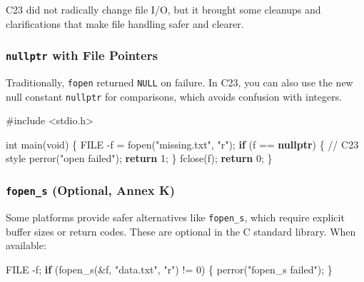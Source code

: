 \documentclass[
  letterpaper,
  DIV=11,
  numbers=noendperiod]{scrreprt}
\newenvironment{Shaded}{\begin{snugshade}}{\end{snugshade}}
\newcommand{\CommentTok}[1]{\textcolor[rgb]{0.37,0.37,0.37}{#1}}
\newcommand{\ControlFlowTok}[1]{\textcolor[rgb]{0.00,0.23,0.31}{\textbf{#1}}}
\newcommand{\DataTypeTok}[1]{\textcolor[rgb]{0.68,0.00,0.00}{#1}}
\newcommand{\DecValTok}[1]{\textcolor[rgb]{0.68,0.00,0.00}{#1}}
\newcommand{\ImportTok}[1]{\textcolor[rgb]{0.00,0.46,0.62}{#1}}
\newcommand{\KeywordTok}[1]{\textcolor[rgb]{0.00,0.23,0.31}{\textbf{#1}}}
\newcommand{\NormalTok}[1]{\textcolor[rgb]{0.00,0.23,0.31}{#1}}
\newcommand{\OperatorTok}[1]{\textcolor[rgb]{0.37,0.37,0.37}{#1}}
\newcommand{\PreprocessorTok}[1]{\textcolor[rgb]{0.68,0.00,0.00}{#1}}
\newcommand{\StringTok}[1]{\textcolor[rgb]{0.13,0.47,0.30}{#1}}
\begin{document}
C23 did not radically change file I/O, but it brought some cleanups and
clarifications that make file handling safer and clearer.

\subsubsection{\texorpdfstring{\texttt{nullptr} with File
Pointers}{nullptr with File Pointers}}\label{nullptr-with-file-pointers}

Traditionally, \texttt{fopen} returned \texttt{NULL} on failure. In C23,
you can also use the new null constant \texttt{nullptr} for comparisons,
which avoids confusion with integers.

\begin{Shaded}
\begin{Highlighting}[]
\PreprocessorTok{\#include }\ImportTok{\textless{}stdio.h\textgreater{}}

\DataTypeTok{int}\NormalTok{ main}\OperatorTok{(}\DataTypeTok{void}\OperatorTok{)} \OperatorTok{\{}
    \DataTypeTok{FILE} \OperatorTok{{-}}\NormalTok{f }\OperatorTok{=}\NormalTok{ fopen}\OperatorTok{(}\StringTok{"missing.txt"}\OperatorTok{,} \StringTok{"r"}\OperatorTok{);}
    \ControlFlowTok{if} \OperatorTok{(}\NormalTok{f }\OperatorTok{==} \KeywordTok{nullptr}\OperatorTok{)} \OperatorTok{\{}   \CommentTok{// C23 style}
\NormalTok{        perror}\OperatorTok{(}\StringTok{"open failed"}\OperatorTok{);}
        \ControlFlowTok{return} \DecValTok{1}\OperatorTok{;}
    \OperatorTok{\}}
\NormalTok{    fclose}\OperatorTok{(}\NormalTok{f}\OperatorTok{);}
    \ControlFlowTok{return} \DecValTok{0}\OperatorTok{;}
\OperatorTok{\}}
\end{Highlighting}
\end{Shaded}

\subsubsection{\texorpdfstring{\texttt{fopen\_s} (Optional, Annex
K)}{fopen\_s (Optional, Annex K)}}\label{fopen_s-optional-annex-k}

Some platforms provide safer alternatives like \texttt{fopen\_s}, which
require explicit buffer sizes or return codes. These are optional in the
C standard library. When available:

\begin{Shaded}
\begin{Highlighting}[]
\DataTypeTok{FILE} \OperatorTok{{-}}\NormalTok{f}\OperatorTok{;}
\ControlFlowTok{if} \OperatorTok{(}\NormalTok{fopen\_s}\OperatorTok{(\&}\NormalTok{f}\OperatorTok{,} \StringTok{"data.txt"}\OperatorTok{,} \StringTok{"r"}\OperatorTok{)} \OperatorTok{!=} \DecValTok{0}\OperatorTok{)} \OperatorTok{\{}
\NormalTok{    perror}\OperatorTok{(}\StringTok{"fopen\_s failed"}\OperatorTok{);}
\OperatorTok{\}}
\end{Highlighting}
\end{Shaded}
\end{document}
